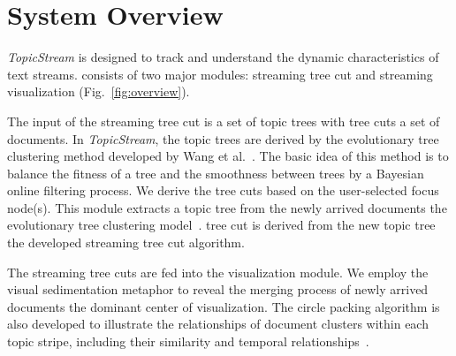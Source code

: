 \section{System Overview}

\emph{\normalsize TopicStream} is designed to track and understand the dynamic characteristics of text streams.
 consists of two major modules: streaming tree cut and streaming visualization (Fig.~\ref{fig:overview}).

The input of the streaming tree cut is a set of topic trees with tree cuts  a set of  documents.
In \emph{\normalsize TopicStream}, the topic trees are derived by the evolutionary tree clustering method developed by Wang et al.~\cite{Wang2013}.
The basic idea of this method is to balance the fitness of a tree and the smoothness between trees by a Bayesian online filtering process.
We derive the tree cuts based on the user-selected focus node(s).
This module  extracts a topic tree from the newly arrived documents  the evolutionary tree clustering model~\cite{Wang2013}.
 tree cut is  derived from the new topic tree  the developed streaming tree cut algorithm.

The streaming tree cuts are  fed into the visualization module.
We employ the visual sedimentation metaphor to reveal the merging process of newly arrived documents  the dominant center of visualization.
The circle packing algorithm is also developed to illustrate the relationships of document clusters within each topic stripe, including their similarity and temporal relationships~\cite{Wang2006visualization,ZhaoTVCG2014}.

